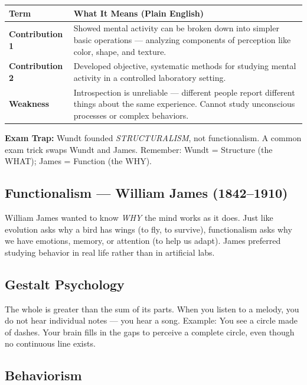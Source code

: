 \documentclass[11pt,a4paper]{article}
\newcommand{\bb}[1]{\textbf{#1}}
\begin{document}
\begin{center}
\renewcommand{\arraystretch}{1.4}
\begin{tabular}{|L{3cm}|L{12.2cm}|}
\hline
{}\color{white}\bb{Term} & \color{white}\bb{What It Means (Plain English)} \\
\hline
\bb{Contribution 1} & Showed mental activity can be broken down into simpler basic operations --- analyzing components of perception like color, shape, and texture. \\
\bb{Contribution 2} & Developed objective, systematic methods for studying mental activity in a controlled laboratory setting. \\
\bb{Weakness} & Introspection is unreliable --- different people report different things about the same experience. Cannot study unconscious processes or complex behaviors. \\
\hline
\end{tabular}
\end{center}

\begin{warnbox}
\bb{Exam Trap:} Wundt founded \textit{STRUCTURALISM}, not functionalism. A common exam trick swaps Wundt and James. Remember: Wundt = Structure (the WHAT); James = Function (the WHY).
\end{warnbox}

\subsection*{Functionalism --- William James (1842--1910)}

William James wanted to know \textit{WHY} the mind works as it does. Just like evolution asks why a bird has wings (to fly, to survive), functionalism asks why we have emotions, memory, or attention (to help us adapt). James preferred studying behavior in real life rather than in artificial labs.

\subsection*{Gestalt Psychology}

The whole is greater than the sum of its parts. When you listen to a melody, you do not hear individual notes --- you hear a song. Example: You see a circle made of dashes. Your brain fills in the gaps to perceive a complete circle, even though no continuous line exists.

\subsection*{Behaviorism}
\end{document}
